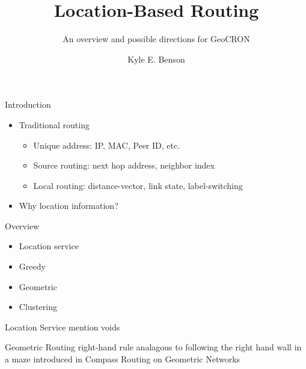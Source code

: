 \documentclass{beamer}
\begin{document}
\title[Location routing]{Location-Based Routing}
\subtitle{An overview and possible directions for GeoCRON}
\author[K. Benson]{Kyle E. Benson}


\begin{frame}
	\titlepage
\end{frame}


\begin{frame}{Introduction}

\begin{itemize}
	\item Traditional routing
	\begin{itemize}
		\item Unique address: IP, MAC, Peer ID, etc.
		\item Source routing: next hop address, neighbor index
		\item Local routing: distance-vector, link state, label-switching
	\end{itemize}
	
	\pause
	\item Why location information?
\end{itemize}

\end{frame}


\begin{frame}{Overview}
	\begin{itemize}
		\item Location service
		\item Greedy
		\item Geometric
		\item Clustering
	\end{itemize}
\end{frame}


\begin{frame}{Location Service}
mention voids
\end{frame}


\begin{frame}{Geometric Routing}
right-hand rule analagous to following the right hand wall in a maze
introduced in Compass Routing on Geometric Networks
\end{frame}
\end{document}

